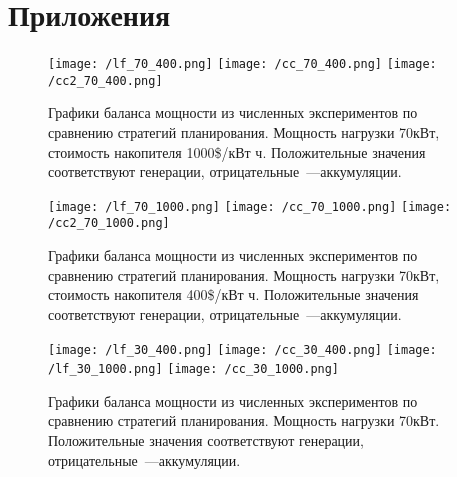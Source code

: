 \section*{Приложения}
\begin{figure}[H]
\texttt{[image: /lf\_70\_400.png]}
\texttt{[image: /cc\_70\_400.png]}
\texttt{[image: /cc2\_70\_400.png]}
\centering
\caption{Графики баланса мощности из численных экспериментов по сравнению стратегий планирования. Мощность нагрузки 70кВт, стоимость накопителя 1000\$/кВт ч. Положительные значения соответствуют генерации, отрицательные~---аккумуляции.}
\label{fig:res_70_400}
\end{figure}

\begin{figure}[H]
\texttt{[image: /lf\_70\_1000.png]}
\texttt{[image: /cc\_70\_1000.png]}
\texttt{[image: /cc2\_70\_1000.png]}
\caption{Графики баланса мощности из численных экспериментов по сравнению стратегий планирования. Мощность нагрузки 70кВт, стоимость накопителя 400\$/кВт ч. Положительные значения соответствуют генерации, отрицательные~---аккумуляции.}
\label{fig:res_70_1000}
\end{figure}

\begin{figure}[H]
\texttt{[image: /lf\_30\_400.png]}
\texttt{[image: /cc\_30\_400.png]}
\texttt{[image: /lf\_30\_1000.png]}
\texttt{[image: /cc\_30\_1000.png]}
\caption{Графики баланса мощности из численных экспериментов по сравнению стратегий планирования. Мощность нагрузки 70кВт. Положительные значения соответствуют генерации, отрицательные~---аккумуляции.}
\label{fig:res_30}
\end{figure}
